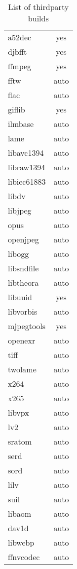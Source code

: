 \begin{table}[htpb]
  \centering
  \caption{List of thirdparty builds}
  \label{tab:List_of_thirdparty_builds}
  \small
  \begin{tabular}{m{8em}c}
    \toprule
 	a52dec   & yes\\
 	djbfft   & yes\\
 	ffmpeg   & yes\\
 	fftw     & auto\\
 	flac     & auto\\
 	giflib   & yes\\
 	ilmbase	 & auto\\
 	lame     & auto\\
 	libavc1394&auto\\
 	libraw1394&auto\\
 	libiec61883&auto\\
    libdv     &auto\\
 	libjpeg   &auto\\
 	opus	  &auto\\
 	openjpeg  &auto\\
 	libogg    &auto\\
 	libsndfile&auto\\
 	libtheora&auto\\
 	libuuid  & yes\\
 	libvorbis&auto\\
 	mjpegtools&yes\\
 	openexr   &auto\\
    tiff      &auto\\
 	twolame   &auto\\
 	x264      &auto\\
 	x265      &auto\\
 	libvpx    &auto\\
 	lv2       &auto\\
 	sratom    &auto\\
 	serd      &auto\\
 	sord      &auto\\
 	lilv      &auto\\
 	suil      &auto\\
 	libaom    &auto\\
 	dav1d     &auto\\
    libwebp   &auto\\
 	ffnvcodec &auto\\
    \bottomrule
  \end{tabular}
\end{table}


